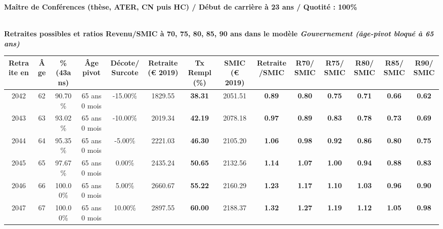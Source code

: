 {\bf \noindent Maître de Conférences (thèse, ATER, CN puis HC) / Début de carrière à 23 ans / Quotité : 100\%}  ~ 

 ~\\{\bf \noindent Retraites possibles et ratios Revenu/SMIC à 70, 75, 80, 85, 90 ans dans le modèle \emph{Gouvernement (âge-pivot bloqué à 65 ans)}}  
 
\begin{adjustbox}{max width=\textwidth} 
\begin{tabular}[htb]{|c|c||c|c|c||c|c||c|c||c|c|c|c|c|} 
\hline 
 Retraite en &  Âge &  \%(43ans) &  Âge pivot &  Décote/Surcote &  Retraite (\euro{} 2019) &  Tx Rempl(\%) &  SMIC (\euro{} 2019) &  Retraite/SMIC &  R70/SMIC &  R75/SMIC &  R80/SMIC &  R85/SMIC &  R90/SMIC \\ 
\hline \hline 
 2042 &  62 &  90.70\% &  65 ans 0 mois &  -15.00\% &  1829.55 &  {\bf 38.31} &  2051.51 &  {\bf {\color{red} 0.89}} &  {\bf {\color{red} 0.80}} &  {\bf {\color{red} 0.75}} &  {\bf {\color{red} 0.71}} &  {\bf {\color{red} 0.66}} &  {\bf {\color{red} 0.62}} \\ 
\hline 
 2043 &  63 &  93.02\% &  65 ans 0 mois &  -10.00\% &  2019.34 &  {\bf 42.19} &  2078.18 &  {\bf {\color{red} 0.97}} &  {\bf {\color{red} 0.89}} &  {\bf {\color{red} 0.83}} &  {\bf {\color{red} 0.78}} &  {\bf {\color{red} 0.73}} &  {\bf {\color{red} 0.69}} \\ 
\hline 
 2044 &  64 &  95.35\% &  65 ans 0 mois &  -5.00\% &  2221.03 &  {\bf 46.30} &  2105.20 &  {\bf 1.06} &  {\bf {\color{red} 0.98}} &  {\bf {\color{red} 0.92}} &  {\bf {\color{red} 0.86}} &  {\bf {\color{red} 0.80}} &  {\bf {\color{red} 0.75}} \\ 
\hline 
 2045 &  65 &  97.67\% &  65 ans 0 mois &  0.00\% &  2435.24 &  {\bf 50.65} &  2132.56 &  {\bf 1.14} &  {\bf 1.07} &  {\bf 1.00} &  {\bf {\color{red} 0.94}} &  {\bf {\color{red} 0.88}} &  {\bf {\color{red} 0.83}} \\ 
\hline 
 2046 &  66 &  100.00\% &  65 ans 0 mois &  5.00\% &  2660.67 &  {\bf 55.22} &  2160.29 &  {\bf 1.23} &  {\bf 1.17} &  {\bf 1.10} &  {\bf 1.03} &  {\bf {\color{red} 0.96}} &  {\bf {\color{red} 0.90}} \\ 
\hline 
 2047 &  67 &  100.00\% &  65 ans 0 mois &  10.00\% &  2897.55 &  {\bf 60.00} &  2188.37 &  {\bf 1.32} &  {\bf 1.27} &  {\bf 1.19} &  {\bf 1.12} &  {\bf 1.05} &  {\bf {\color{red} 0.98}} \\ 
\hline 
\hline 
\end{tabular} 
\end{adjustbox} 
 
